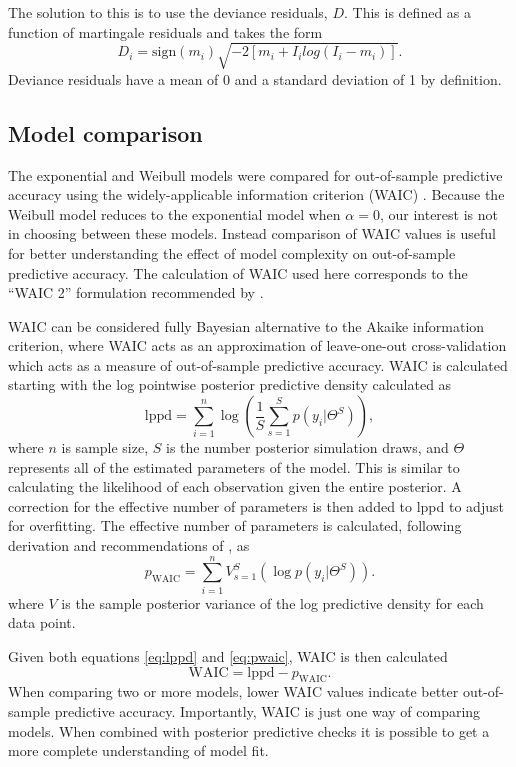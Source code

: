 \documentclass{article}
\begin{document}
The solution to this is to use the deviance residuals, \(D\). This is defined as a function of martingale residuals and takes the form
\begin{equation*}
  D_{i} = \text{sign}(m_{i}) \sqrt{-2[m_{i} + I_{i}log(I_{i} - m_{i})]}.
\end{equation*}
Deviance residuals have a mean of 0 and a standard deviation of 1 by definition.

\subsection{Model comparison}
The exponential and Weibull models were compared for out-of-sample predictive accuracy using the widely-applicable information criterion (WAIC) \cite{Watanabe2010a}. Because the Weibull model reduces to the exponential model when \(\alpha = 0\), our interest is not in choosing between these models. Instead comparison of WAIC values is useful for better understanding the effect of model complexity on out-of-sample predictive accuracy. The calculation of WAIC used here corresponds to the ``WAIC 2'' formulation recommended by \cite{Gelman2013d}.

WAIC can be considered fully Bayesian alternative to the Akaike information criterion, where WAIC acts as an approximation of leave-one-out cross-validation which acts as a measure of out-of-sample predictive accuracy. WAIC is calculated starting with the log pointwise posterior predictive density calculated as
\begin{equation}
  \mathrm{lppd} = \sum_{i = 1}^{n} \log \left(\frac{1}{S} \sum_{s = 1}^{S} p(y_{i}|\Theta^{S})\right),
  \label{eq:lppd}
\end{equation}
where \(n\) is sample size, \(S\) is the number posterior simulation draws, and \(\Theta\) represents all of the estimated parameters of the model. This is similar to calculating the likelihood of each observation given the entire posterior. A correction for the effective number of parameters is then added to lppd to adjust for overfitting. The effective number of parameters is calculated, following derivation and recommendations of \cite{Gelman2013d}, as
\begin{equation}
  p_{\mathrm{WAIC}} = \sum_{i = 1}^{n} V_{s = 1}^{S} (\log p(y_{i}|\Theta^{S})).
  \label{eq:pwaic}
\end{equation}
where \(V\) is the sample posterior variance of the log predictive density for each data point.

Given both equations \ref{eq:lppd} and \ref{eq:pwaic}, WAIC is then calculated
\begin{equation}
  \mathrm{WAIC} = \mathrm{lppd} - p_{\mathrm{WAIC}}.
  \label{eq:waic}
\end{equation}
When comparing two or more models, lower WAIC values indicate better out-of-sample predictive accuracy. Importantly, WAIC is just one way of comparing models. When combined with posterior predictive checks it is possible to get a more complete understanding of model fit.
\end{document}
